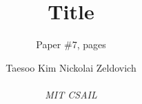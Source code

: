 \title{Title}

\ifdefined\DRAFT
\pagestyle{fancyplain}
\author{Paper \#7, \pageref{LastPage} pages}
\rhead{\thedate}
\else
\author{
Taesoo Kim \; Nickolai Zeldovich \\
\vspace{0.01in}\\
\emph{MIT CSAIL}}
\fi
